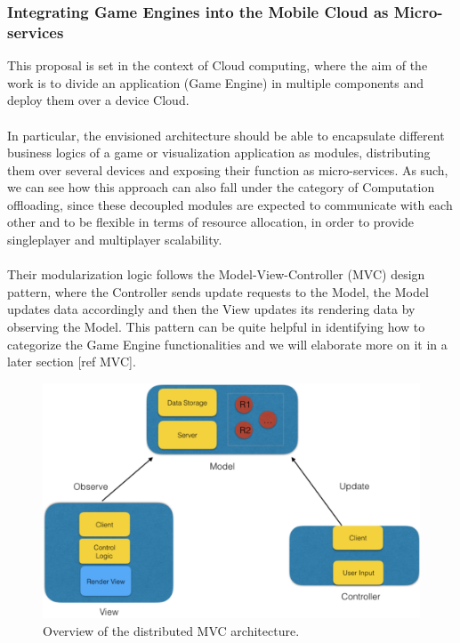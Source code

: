 \subsubsection{Integrating Game Engines into the Mobile Cloud as Micro-services \cite{womak:game-engines-cloud-microservices}}\label{distribution-MVC}
This proposal is set in the context of Cloud computing, where the aim of the work is to divide an application (Game Engine) in multiple components and deploy them over a device Cloud. \\ \\
In particular, the envisioned architecture should be able to encapsulate different business logics of a game or visualization application as modules, distributing them over several devices and exposing their function as micro-services. As such, we can see how this approach can also fall under the category of Computation offloading, since these decoupled modules are expected to communicate with each other and to be flexible in terms of resource allocation, in order to provide singleplayer and multiplayer scalability. \\ \\
Their modularization logic follows the Model-View-Controller (MVC) design pattern, where the Controller sends update requests to the Model, the Model updates data accordingly and then the View updates its rendering data by observing the Model. This pattern can be quite helpful in identifying how to categorize the Game Engine functionalities and we will elaborate more on it in a later section [ref MVC].
\begin{figure}[h!]
	\centering
	\includegraphics[width=0.9\linewidth]{"immagini/State-of-the-art/MVC distributed architecture"}
	\caption[Overview of the distributed MVC architecture]{Overview of the distributed MVC architecture.}
	\label{fig:mvc-distributed-architecture}
\end{figure}
